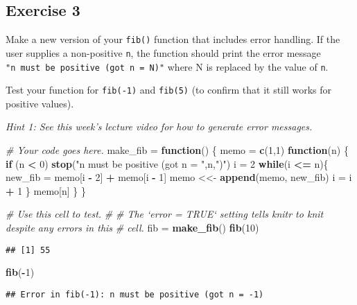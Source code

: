 \documentclass[
]{article}
\newenvironment{Shaded}{\begin{snugshade}}{\end{snugshade}}
\newcommand{\CommentTok}[1]{\textcolor[rgb]{0.56,0.35,0.01}{\textit{#1}}}
\newcommand{\ControlFlowTok}[1]{\textcolor[rgb]{0.13,0.29,0.53}{\textbf{#1}}}
\newcommand{\DecValTok}[1]{\textcolor[rgb]{0.00,0.00,0.81}{#1}}
\newcommand{\KeywordTok}[1]{\textcolor[rgb]{0.13,0.29,0.53}{\textbf{#1}}}
\newcommand{\NormalTok}[1]{#1}
\newcommand{\OperatorTok}[1]{\textcolor[rgb]{0.81,0.36,0.00}{\textbf{#1}}}
\newcommand{\StringTok}[1]{\textcolor[rgb]{0.31,0.60,0.02}{#1}}
\begin{document}
\hypertarget{exercise-3}{%
\subsection{Exercise 3}\label{exercise-3}}

Make a new version of your \texttt{fib()} function that includes error
handling. If the user supplies a non-positive \texttt{n}, the function
should print the error message
\texttt{"n\ must\ be\ positive\ (got\ n\ =\ N)"} where N is replaced by
the value of \texttt{n}.

Test your function for \texttt{fib(-1)} and \texttt{fib(5)} (to confirm
that it still works for positive values).

\emph{Hint 1: See this week's lecture video for how to generate error
messages.}

\begin{Shaded}
\begin{Highlighting}[]
\CommentTok{# Your code goes here.}
\NormalTok{make_fib =}\StringTok{ }\ControlFlowTok{function}\NormalTok{() \{}
\NormalTok{  memo =}\StringTok{ }\KeywordTok{c}\NormalTok{(}\DecValTok{1}\NormalTok{,}\DecValTok{1}\NormalTok{)}
  \ControlFlowTok{function}\NormalTok{(n) \{}
    \ControlFlowTok{if}\NormalTok{ (n }\OperatorTok{<}\StringTok{ }\DecValTok{0}\NormalTok{) }\KeywordTok{stop}\NormalTok{(}\StringTok{"n must be positive (got n = "}\NormalTok{,n,}\StringTok{")"}\NormalTok{)}
\NormalTok{    i =}\StringTok{ }\DecValTok{2}
    \ControlFlowTok{while}\NormalTok{(i }\OperatorTok{<=}\StringTok{ }\NormalTok{n)\{}
\NormalTok{      new_fib =}\StringTok{ }\NormalTok{memo[i }\OperatorTok{-}\StringTok{ }\DecValTok{2}\NormalTok{] }\OperatorTok{+}\StringTok{ }\NormalTok{memo[i }\OperatorTok{-}\StringTok{ }\DecValTok{1}\NormalTok{]}
\NormalTok{      memo <<-}\StringTok{ }\KeywordTok{append}\NormalTok{(memo, new_fib)}
\NormalTok{      i =}\StringTok{ }\NormalTok{i }\OperatorTok{+}\StringTok{ }\DecValTok{1}
\NormalTok{    \}}
\NormalTok{    memo[n]}
\NormalTok{  \}}
\NormalTok{\}}
\end{Highlighting}
\end{Shaded}

\begin{Shaded}
\begin{Highlighting}[]
\CommentTok{# Use this cell to test.}
\CommentTok{#}
\CommentTok{# The `error = TRUE` setting tells knitr to knit despite any errors in this}
\CommentTok{# cell.}
\NormalTok{fib =}\StringTok{ }\KeywordTok{make_fib}\NormalTok{()}
\KeywordTok{fib}\NormalTok{(}\DecValTok{10}\NormalTok{)}
\end{Highlighting}
\end{Shaded}

\begin{verbatim}
## [1] 55
\end{verbatim}

\begin{Shaded}
\begin{Highlighting}[]
\KeywordTok{fib}\NormalTok{(}\OperatorTok{-}\DecValTok{1}\NormalTok{)}
\end{Highlighting}
\end{Shaded}

\begin{verbatim}
## Error in fib(-1): n must be positive (got n = -1)
\end{verbatim}
\end{document}
